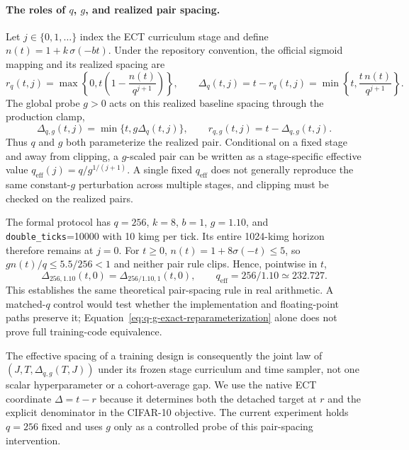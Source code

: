 \documentclass{article}
\begin{document}
\paragraph{The roles of $q$, $g$, and realized pair spacing.}

Let $j\in\{0,1,\ldots\}$ index the ECT curriculum stage and define
$n(t)=1+k\,\sigma(-bt)$. Under the repository convention, the official
sigmoid mapping and its realized spacing are
\begin{equation}
  r_q(t,j)=\max\!\left\{0,
    t\left(1-\frac{n(t)}{q^{j+1}}\right)\right\},
  \qquad
  \Delta_q(t,j)=t-r_q(t,j)
  =\min\!\left\{t,\frac{t\,n(t)}{q^{j+1}}\right\}.
  \label{eq:q-realized-spacing}
\end{equation}
The global probe $g>0$ acts on this realized baseline spacing through the
production clamp,
\begin{equation}
  \Delta_{q,g}(t,j)=\min\{t,g\Delta_q(t,j)\},
  \qquad r_{q,g}(t,j)=t-\Delta_{q,g}(t,j).
  \label{eq:g-realized-spacing}
\end{equation}
Thus $q$ and $g$ both parameterize the realized pair. Conditional on a fixed
stage and away from clipping, a
$g$-scaled pair can be written as a stage-specific effective value
$q_{\mathrm{eff}}(j)=q/g^{1/(j+1)}$. A single fixed $q_{\mathrm{eff}}$ does not
generally reproduce the same constant-$g$ perturbation across multiple stages,
and clipping must be checked on the realized pairs.

The formal protocol has $q=256$, $k=8$, $b=1$, $g=1.10$, and
\texttt{double\_ticks}=10000 with 10 kimg per tick. Its entire 1024-kimg
horizon therefore remains at $j=0$.
For $t\geq0$, $n(t)=1+8\sigma(-t)\leq5$, so
$g n(t)/q\leq5.5/256<1$ and neither pair rule clips. Hence, pointwise in $t$,
\begin{equation}
  \Delta_{256,1.10}(t,0)
  =\Delta_{256/1.10,1}(t,0),
  \qquad q_{\mathrm{eff}}=256/1.10\simeq232.727.
  \label{eq:q-g-exact-reparameterization}
\end{equation}
This establishes the same theoretical pair-spacing rule in real arithmetic.
A matched-$q$ control would test whether the implementation and floating-point
paths preserve it; Equation~\eqref{eq:q-g-exact-reparameterization} alone does
not prove full training-code equivalence.

The effective spacing of a training design is consequently the joint law of
$(J,T,\Delta_{q,g}(T,J))$ under its frozen stage curriculum and time sampler,
not one scalar hyperparameter or a cohort-average gap. We use the native ECT
coordinate $\Delta=t-r$ because it determines both the detached target at $r$
and the explicit denominator in the CIFAR-10 objective. The current experiment
holds $q=256$ fixed and uses $g$ only as a controlled probe of this pair-spacing
intervention.
\end{document}
